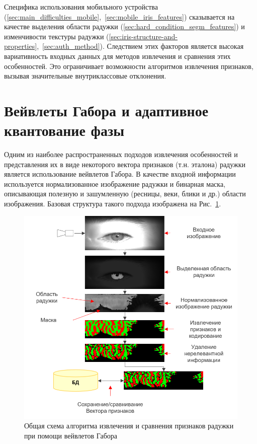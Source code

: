 Специфика использования мобильного устройства (\ref{sec:main_difficulties_mobile},~\ref{sec:mobile_iris_features}) сказывается на качестве выделения области радужки (\ref{sec:hard_condition_segm_features}) и изменчивости текстуры радужки (\ref{sec:iris-structure-and-properties},~\ref{sec:auth_method}). Следствием этих факторов является высокая вариативность входных данных для методов извлечения и сравнения этих особенностей. Это ограничивает возможности алгоритмов извлечения признаков, вызывая значительные внутриклассовые отклонения.

\section{Вейвлеты Габора и адаптивное квантование фазы}
\label{sec:gabor-and-quantization}

Одним из наиболее распространенных подходов извлечения особенностей и представления их в виде некоторого вектора признаков (т.н. эталона) радужки является использование вейвлетов Габора. В качестве входной информации используется нормализованное изображение радужки и бинарная маска, описывающая полезную и зашумленную (ресницы, веки, блики и др.) области изображения. Базовая структура такого подхода изображена на Рис.~\ref{fig:irec-basic-stages-gabor}.

\begin{figure}[ht!]
	\begin{center}
		\includegraphics[width=0.75\columnwidth]{pictures/irec-basic-stages-gabor.png}
		\caption{Общая схема алгоритма извлечения и сравнения признаков радужки при помощи вейвлетов Габора}
		\label{fig:irec-basic-stages-gabor}
	\end{center}
\end{figure}

